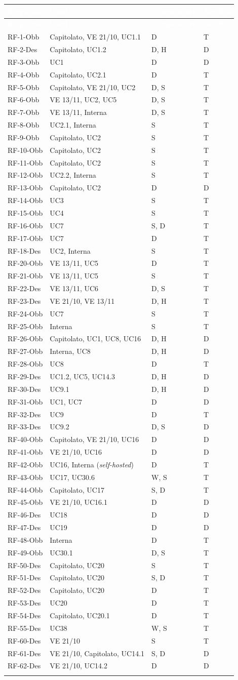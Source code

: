\documentclass[12pt,a4paper]{article}
\newcommand{\thc}[1]{\textcolor{white}{\textbf{#1}}}
\newcommand{\rl}{\\ \arrayrulecolor{bfline}\hline}
\begin{document}
\begin{longtable}{>{\raggedright\arraybackslash}p{}>{\raggedright\arraybackslash}p{}>{\raggedright\arraybackslash}p{}>{\raggedright\arraybackslash}p{}}
\rowcolor{bfblue}\thc{Requisito} & \thc{Fonti} & \thc{Componente} & \thc{Verifica} \\
\endfirsthead
\rowcolor{bfblue}\thc{Requisito} & \thc{Fonti} & \thc{Componente} & \thc{Verifica} \\
\endhead
RF-1-Obb & Capitolato, VE 21/10, UC1.1 & D & T \rl
RF-2-Des & Capitolato, UC1.2 & D, H & D \rl
RF-3-Obb & UC1 & D & D \rl
RF-4-Obb & Capitolato, UC2.1 & D & T \rl
RF-5-Obb & Capitolato, VE 21/10, UC2 & D, S & T \rl
RF-6-Obb & VE 13/11, UC2, UC5 & D, S & T \rl
RF-7-Obb & VE 13/11, Interna & D, S & T \rl
RF-8-Obb & UC2.1, Interna & S & T \rl
RF-9-Obb & Capitolato, UC2 & S & T \rl
RF-10-Obb & Capitolato, UC2 & S & T \rl
RF-11-Obb & Capitolato, UC2 & S & T \rl
RF-12-Obb & UC2.2, Interna & S & T \rl
RF-13-Obb & Capitolato, UC2 & D & D \rl
RF-14-Obb & UC3 & S & T \rl
RF-15-Obb & UC4 & S & T \rl
RF-16-Obb & UC7 & S, D & T \rl
RF-17-Obb & UC7 & D & T \rl
RF-18-Des & UC2, Interna & S & T \rl
RF-20-Obb & VE 13/11, UC5 & D & T \rl
RF-21-Obb & VE 13/11, UC5 & S & T \rl
RF-22-Des & VE 13/11, UC6 & D, S & T \rl
RF-23-Des & VE 21/10, VE 13/11 & D, H & T \rl
RF-24-Obb & UC7 & S & T \rl
RF-25-Obb & Interna & S & T \rl
RF-26-Obb & Capitolato, UC1, UC8, UC16 & D, H & D \rl
RF-27-Obb & Interna, UC8 & D, H & D \rl
RF-28-Obb & UC8 & D & T \rl
RF-29-Des & UC1.2, UC5, UC14.3 & D, H & D \rl
RF-30-Des & UC9.1 & D, H & D \rl
RF-31-Obb & UC1, UC7 & D & D \rl
RF-32-Des & UC9 & D & T \rl
RF-33-Des & UC9.2 & D, S & D \rl
RF-40-Obb & Capitolato, VE 21/10, UC16 & D & D \rl
RF-41-Obb & VE 21/10, UC16 & D & D \rl
RF-42-Obb & UC16, Interna (\emph{self-hosted}) & D & T \rl
RF-43-Obb & UC17, UC30.6 & W, S & T \rl
RF-44-Obb & Capitolato, UC17 & S, D & T \rl
RF-45-Obb & VE 21/10, UC16.1 & D & D \rl
RF-46-Des & UC18 & D & D \rl
RF-47-Des & UC19 & D & D \rl
RF-48-Obb & Interna & D & T \rl
RF-49-Obb & UC30.1 & D, S & T \rl
RF-50-Des & Capitolato, UC20 & S & T \rl
RF-51-Des & Capitolato, UC20 & S, D & T \rl
RF-52-Des & Capitolato, UC20 & D & T \rl
RF-53-Des & UC20 & D & T \rl
RF-54-Des & Capitolato, UC20.1 & D & T \rl
RF-55-Des & UC38 & W, S & T \rl
RF-60-Des & VE 21/10 & S & T \rl
RF-61-Des & VE 21/10, Capitolato, UC14.1 & S, D & D \rl
RF-62-Des & VE 21/10, UC14.2 & D & D \rl

\end{longtable}
\end{document}
